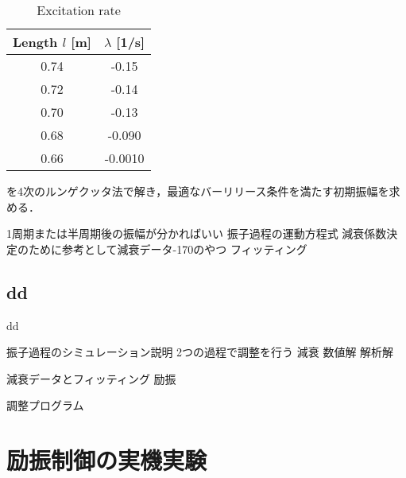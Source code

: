             \begin{table}[tb]
              \begin{center}
                \caption{Excitation rate}
                \vspace{2mm}
                \begin{tabular}{c|c}
                  \hline
                  Length $l$ [m] & $\lambda$ [1/s] \\
                  \hline
                  0.74 & -0.15 \\
                  0.72 & -0.14 \\
                  0.70 & -0.13 \\
                  0.68 & -0.090 \\
                  0.66 & -0.0010 \\                     
                  \hline
                \end{tabular}
              \end{center}
            \end{table}
            


          



          

          
          
          
          
            を4次のルンゲクッタ法で解き，最適なバーリリース条件を満たす初期振幅を求める．
          
          


          1周期または半周期後の振幅が分かればいい
          振子過程の運動方程式
          減衰係数決定のために参考として減衰データ-170のやつ
          フィッティング


          

        \subsection{dd}
        
          dd

        振子過程のシミュレーション説明
        2つの過程で調整を行う
          減衰
            数値解  
            解析解
            
            減衰データとフィッティング
          励振

          調整プログラム
        \section{励振制御の実機実験}


